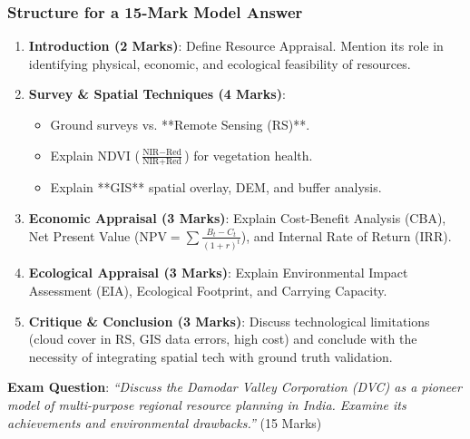 \documentclass[11pt,a4paper]{article}
\begin{document}
\subsubsection{Structure for a 15-Mark Model Answer}
\begin{enumerate}[leftmargin=*]
  \item \textbf{Introduction (2 Marks)}: Define Resource Appraisal. Mention its role in identifying physical, economic, and ecological feasibility of resources.
  \item \textbf{Survey \& Spatial Techniques (4 Marks)}:
  \begin{itemize}
    \item Ground surveys vs. **Remote Sensing (RS)**.
    \item Explain NDVI ($\frac{\text{NIR}-\text{Red}}{\text{NIR}+\text{Red}}$) for vegetation health.
    \item Explain **GIS** spatial overlay, DEM, and buffer analysis.
  \end{itemize}
  \item \textbf{Economic Appraisal (3 Marks)}: Explain Cost-Benefit Analysis (CBA), Net Present Value ($\text{NPV} = \sum \frac{B_t-C_t}{(1+r)^t}$), and Internal Rate of Return (IRR).
  \item \textbf{Ecological Appraisal (3 Marks)}: Explain Environmental Impact Assessment (EIA), Ecological Footprint, and Carrying Capacity.
  \item \textbf{Critique \& Conclusion (3 Marks)}: Discuss technological limitations (cloud cover in RS, GIS data errors, high cost) and conclude with the necessity of integrating spatial tech with ground truth validation.
\end{enumerate}

\begin{exambox}
\textbf{Exam Question}: \textit{``Discuss the Damodar Valley Corporation (DVC) as a pioneer model of multi-purpose regional resource planning in India. Examine its achievements and environmental drawbacks.''} (15 Marks)
\end{exambox}
\end{document}
